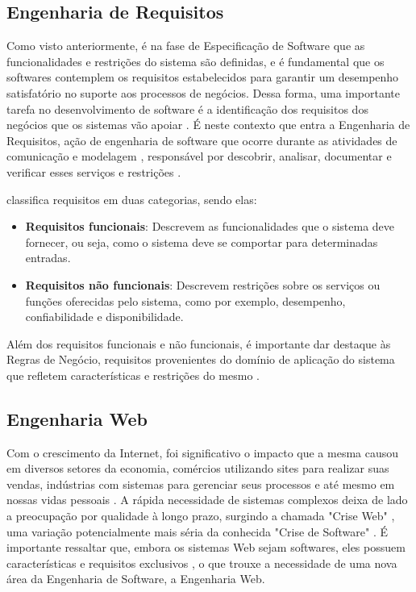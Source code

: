 \subsection{Engenharia de Requisitos}
\label{subsec-fundteo-engsoft-engreq}

Como visto anteriormente, é na fase de Especificação de Software que as funcionalidades 
e restrições do sistema são definidas, e é fundamental que os softwares contemplem os
requisitos estabelecidos para garantir um desempenho satisfatório no suporte aos processos 
de negócios. Dessa forma, uma importante tarefa no desenvolvimento de software é a
identificação dos requisitos dos negócios que os sistemas vão apoiar \cite{falbo:2017}.
É neste contexto que entra a Engenharia de Requisitos, ação de engenharia de 
software que ocorre durante as atividades de comunicação e modelagem \cite{pressman:2011},
responsável por descobrir, analisar, documentar e verificar esses serviços e restrições \cite{sommerville:2011}. 

 classifica requisitos em duas categorias, sendo elas:

\begin{itemize}
    \item \textbf{Requisitos funcionais}: Descrevem as funcionalidades que o sistema deve 
        fornecer, ou seja, como o sistema deve se comportar para determinadas entradas.
    \item \textbf{Requisitos não funcionais}: Descrevem restrições sobre os serviços ou
        funções oferecidas pelo sistema, como por exemplo, desempenho, confiabilidade e 
        disponibilidade. 
\end{itemize}

Além dos requisitos funcionais e não funcionais, é importante dar destaque às Regras de
Negócio, requisitos provenientes do domínio de aplicação do sistema que refletem características
e restrições do mesmo \cite{sommerville:2011,falbo:2014}.


\subsection{Engenharia Web}
\label{subsec-fundteo-engsoft-engweb}

Com o crescimento da Internet, foi significativo o impacto que a mesma causou em diversos
setores da economia, comércios utilizando sites para realizar suas vendas, indústrias com
sistemas para gerenciar seus processos e até mesmo em nossas vidas pessoais \cite{murugesan:2001}.
A rápida necessidade de sistemas complexos deixa de lado a preocupação por qualidade à longo prazo,
surgindo a chamada "Crise Web" \cite{murugesan:2001}, uma variação potencialmente mais séria da 
conhecida "Crise de Software" \cite{gibbs:1994}. É importante ressaltar que, embora os sistemas Web
sejam softwares, eles possuem características e requisitos exclusivos \cite{pressman:2011},
o que trouxe a necessidade de uma nova área da Engenharia de Software, a Engenharia Web.

